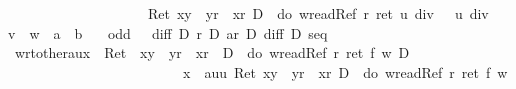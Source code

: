 \begin{isabellebody}
\ \ \ \ \ \ \ \ \ \ \ \ \ \ \ \ \ \ \ \ Ret\ {\isacharparenleft}x{\isasymnoteq}y\ {\isasymand}\ y{\isasymnoteq}r\ {\isasymand}\ x{\isasymnoteq}r{\isacharparenright}\ {\isasymand}\isactrlsub D\ {\isasymUp}\ {\isacharparenleft}do\ {\isacharbraceleft}w{\isasymleftarrow}readRef\ r{\isacharsemicolon}\ ret\ {\isacharparenleft}{\isacharparenleft}u\ div\ {}\ {\isacharplus}\ u\ div\ {}{\isacharparenright}\ {\isacharasterisk}\ v\ {\isacharplus}\ w\ {\isacharequal}\ a\ {\isacharasterisk}\ b{\isacharparenright}{\isacharbraceright}{\isacharparenright}{\isachardoublequote}\isanewline
\ \ {\isacharparenleft}\ {\isachardoublequote}{\isacharquery}odd\ {\isasymLongrightarrow}\ {\isasymturnstile}\ {\isacharparenleft}{\isacharquery}diff\ {\isasymand}\isactrlsub D\ {\isacharquery}r\ {\isasymand}\isactrlsub D\ {\isacharquery}ar{\isacharparenright}\ {\isasymlongrightarrow}\isactrlsub D\ {\isacharquery}diff\ {\isasymand}\isactrlsub D\ {\isacharquery}seq{\isachardoublequote}{\isacharparenright}\isamarkupfalse%
\isamarkupfalse%
\isamarkupfalse%
\isamarkupfalse%
\isamarkupfalse%
\isamarkupfalse%
\isamarkupfalse%
\isamarkupfalse%
\isamarkupfalse%
\isamarkupfalse%
\isamarkupfalse%
\isamarkupfalse%
\isamarkupfalse%
\isamarkupfalse%
\isamarkupfalse%
\isamarkupfalse%
\isamarkupfalse%
\isamarkupfalse%
\isamarkupfalse%
\isamarkupfalse%
\isamarkupfalse%
\isamarkupfalse%
\isanewline
\isanewline
\isamarkupfalse%
\ wrt{\isacharunderscore}other{\isacharunderscore}aux{\isacharcolon}\ {\isachardoublequote}{\isasymturnstile}\ Ret\ {\isacharparenleft}\ x{\isasymnoteq}y\ {\isasymand}\ y{\isasymnoteq}r\ {\isasymand}\ x{\isasymnoteq}r\ {\isacharparenright}\ {\isasymand}\isactrlsub D\ {\isasymUp}\ {\isacharparenleft}do\ {\isacharbraceleft}w{\isasymleftarrow}readRef\ r{\isacharsemicolon}\ ret\ {\isacharparenleft}f\ w{\isacharparenright}{\isacharbraceright}{\isacharparenright}\ {\isasymlongrightarrow}\isactrlsub D\ \isanewline
\ \ \ \ \ \ \ \ \ \ \ \ \ \ \ \ \ \ \ \ \ \ \ \ {\isacharbrackleft}{\isacharhash}\ x\ {\isacharcolon}{\isacharequal}\ a{\isacharbrackright}{\isacharparenleft}{\isasymlambda}uu{\isachardot}\ Ret\ {\isacharparenleft}x{\isasymnoteq}y\ {\isasymand}\ y{\isasymnoteq}r\ {\isasymand}\ x{\isasymnoteq}r{\isacharparenright}\ {\isasymand}\isactrlsub D\ {\isasymUp}\ {\isacharparenleft}do\ {\isacharbraceleft}w{\isasymleftarrow}readRef\ r{\isacharsemicolon}\ ret\ {\isacharparenleft}f\ w{\isacharparenright}{\isacharbraceright}{\isacharparenright}{\isacharparenright}{\isachardoublequote}\isamarkupfalse%
\isamarkupfalse%
\isamarkupfalse%
\isamarkupfalse%

\end{isabellebody}
